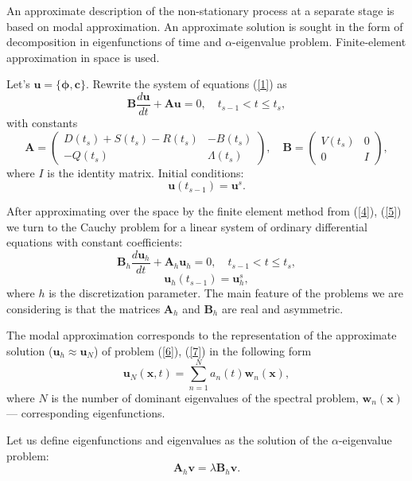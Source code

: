 \documentclass[a4paper]{jpconf}
\begin{document}
An approximate description of the non-stationary process at a separate stage is based on modal approximation. An approximate solution is sought in the form of decomposition in eigenfunctions of time and $\alpha$-eigenvalue problem. Finite-element approximation in space is used.

Let's $\bm u = \{\bm \phi, \bm c\}$. Rewrite the system of equations (\ref{1}) as
\begin{equation}\label{4}
 \bm B \frac{d \bm u}{d t} + \bm A \bm u = 0,
 \quad t_{s-1} < t \leq t_s,
\end{equation} 
with constants
\[
 \bm A = 
 \begin{pmatrix}
 D(t_s)+S(t_s) - R(t_s) &  - B(t_s) \\
 - Q(t_s) & \Lambda(t_s) 
 \end{pmatrix} ,
 \quad  \bm B = 
 \begin{pmatrix}
 V(t_s) & 0 \\
 0 & I 
 \end{pmatrix} ,
\] 
where $I$ is the identity matrix. Initial conditions:
\begin{equation}\label{5}
 \bm u(t_{s-1}) = \bm u^s .
\end{equation} 

After approximating over the space by the finite element method from (\ref{4}), (\ref{5}) 
we turn to the Cauchy problem for a linear system of ordinary differential equations with constant coefficients:
\begin{equation}\label{6}
 \bm B_h \frac{d \bm u_h}{d t} + \bm A_h \bm u_h = 0,
 \quad t_{s-1} < t \leq t_s,
\end{equation}   
\begin{equation}\label{7}
 \bm u_h(t_{s-1}) = \bm u_h^s ,
\end{equation} 
where $h$ is the discretization parameter. The main feature of the problems we are considering is that the matrices $\bm A_h$ and $\bm B_h$ 
are real and asymmetric.

The modal approximation corresponds to the representation of the approximate solution  ($\bm u_h \approx \bm u_N$) of problem   (\ref{6}), (\ref{7}) in the following form
\begin{equation}\label{8}
 \bm u_N(\bm x, t) =
 \sum_{n=1}^{N} a_n(t) \bm w_n(\bm x),
\end{equation} 
where $N$ is the number of dominant eigenvalues of the spectral problem, 
$\bm w_n(\bm x)$ --- corresponding eigenfunctions.

Let us define eigenfunctions and eigenvalues as the solution of the  $\alpha$-eigenvalue problem:
\begin{equation}\label{9}
 \bm A_h \bm v = \lambda  \bm B_h \bm v .
\end{equation} 
\end{document}

